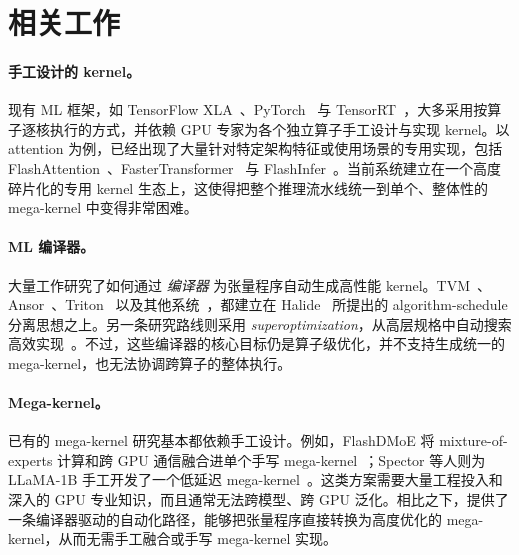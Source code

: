 \section{相关工作}
\label{sec:related}

\paragraph{手工设计的 kernel。}
现有 ML 框架，如 TensorFlow XLA~\cite{tensorflow_xla, Tensorflow}、PyTorch~\cite{pytorch} 与 TensorRT~\cite{tensorrt}，大多采用按算子逐核执行的方式，并依赖 GPU 专家为各个独立算子手工设计与实现 kernel。以 attention 为例，已经出现了大量针对特定架构特征或使用场景的专用实现，包括 FlashAttention~\cite{dao2023flash, tri2023flashdecoding, hong2024flashdecoding}、FasterTransformer~\cite{fastertransformer} 与 FlashInfer~\cite{ye2025flashinfer}。当前系统建立在一个高度碎片化的专用 kernel 生态上，这使得把整个推理流水线统一到单个、整体性的 mega-kernel 中变得非常困难。

\paragraph{ML 编译器。}
大量工作研究了如何通过 {\em 编译器} 为张量程序自动生成高性能 kernel。TVM~\cite{tvm, tvm_auto_tuner}、Ansor~\cite{ansor}、Triton~\cite{tillet2019triton} 以及其他系统~\cite{zheng2020flextensor, hagedorn2023graphene, feng2022tensorir, hu2024korch}，都建立在 Halide~\cite{halide, autohalide} 所提出的 algorithm-schedule 分离思想之上。另一条研究路线则采用 {\em superoptimization}，从高层规格中自动搜索高效实现~\cite{TASO, wang2021pet, zheng2023einnet, tensat, unger2022unity}。不过，这些编译器的核心目标仍是算子级优化，并不支持生成统一的 mega-kernel，也无法协调跨算子的整体执行。

\paragraph{Mega-kernel。}
已有的 mega-kernel 研究基本都依赖手工设计。例如，FlashDMoE 将 mixture-of-experts 计算和跨 GPU 通信融合进单个手写 mega-kernel~\cite{aimuyo2025flashdmoe}；Spector 等人则为 LLaMA-1B 手工开发了一个低延迟 mega-kernel~\cite{touvron2023llama, megakernel}。这类方案需要大量工程投入和深入的 GPU 专业知识，而且通常无法跨模型、跨 GPU 泛化。相比之下，\sys 提供了一条编译器驱动的自动化路径，能够把张量程序直接转换为高度优化的 mega-kernel，从而无需手工融合或手写 mega-kernel 实现。
